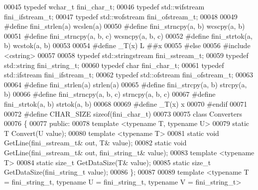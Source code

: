 \begin{DoxyCode}
00045   \textcolor{keyword}{typedef} \textcolor{keywordtype}{wchar\_t} fini_char_t;
00046   \textcolor{keyword}{typedef} std::wifstream fini_ifstream_t;
00047   \textcolor{keyword}{typedef} std::wofstream fini_ofstream_t;
00048 
00049 \textcolor{preprocessor}{  #define fini\_strlen(a) wcslen(a)}
00050 \textcolor{preprocessor}{  #define fini\_strncpy(a, b) wcscpy(a, b)}
00051 \textcolor{preprocessor}{  #define fini\_strncpy(a, b, c) wcsncpy(a, b, c)}
00052 \textcolor{preprocessor}{  #define fini\_strtok(a, b) wcstok(a, b)}
00053 
00054 \textcolor{preprocessor}{  #define \_T(x) L ##x}
00055 \textcolor{preprocessor}{#else}
00056 \textcolor{preprocessor}{  #include <cstring>}
00057 
00058   \textcolor{keyword}{typedef} std::stringstream fini_sstream_t;
00059   \textcolor{keyword}{typedef} std::string fini_string_t;
00060   \textcolor{keyword}{typedef} \textcolor{keywordtype}{char} fini_char_t;
00061   \textcolor{keyword}{typedef} std::ifstream fini_ifstream_t;
00062   \textcolor{keyword}{typedef} std::ofstream fini_ofstream_t;
00063 
00064 \textcolor{preprocessor}{  #define fini\_strlen(a) strlen(a)}
00065 \textcolor{preprocessor}{  #define fini\_strcpy(a, b) strcpy(a, b)}
00066 \textcolor{preprocessor}{  #define fini\_strncpy(a, b, c) strncpy(a, b, c)}
00067 \textcolor{preprocessor}{  #define fini\_strtok(a, b) strtok(a, b)}
00068 
00069 \textcolor{preprocessor}{  #define \_T(x) x}
00070 \textcolor{preprocessor}{#endif}
00071 
00072 \textcolor{preprocessor}{#define CHAR\_SIZE sizeof(fini\_char\_t)}
00073 
00075 \textcolor{keyword}{class }Converters
00076 \{
00077 \textcolor{keyword}{public}:
00078    \textcolor{keyword}{template} <\textcolor{keyword}{typename} T, \textcolor{keyword}{typename} U>
00079      \textcolor{keyword}{static} T Convert(U value);
00080    \textcolor{keyword}{template} <\textcolor{keyword}{typename} T>
00081       \textcolor{keyword}{static} \textcolor{keywordtype}{void} GetLine(fini_sstream_t& out, T& value);
00082    \textcolor{keyword}{static} \textcolor{keywordtype}{void} GetLine(fini_sstream_t& out, fini_string_t& value);
00083    \textcolor{keyword}{template} <\textcolor{keyword}{typename} T>
00084       \textcolor{keyword}{static} \textcolor{keywordtype}{size\_t} GetDataSize(T& value);
00085    \textcolor{keyword}{static} \textcolor{keywordtype}{size\_t} GetDataSize(fini_string_t value);
00086 \};
00087 
00089 \textcolor{keyword}{template} <\textcolor{keyword}{typename} T = fini\_\textcolor{keywordtype}{string}\_t, \textcolor{keyword}{typename} U = fini\_\textcolor{keywordtype}{string}\_t, \textcolor{keyword}{typename} V = fini\_\textcolor{keywordtype}{string}\_t>

\end{DoxyCode}
